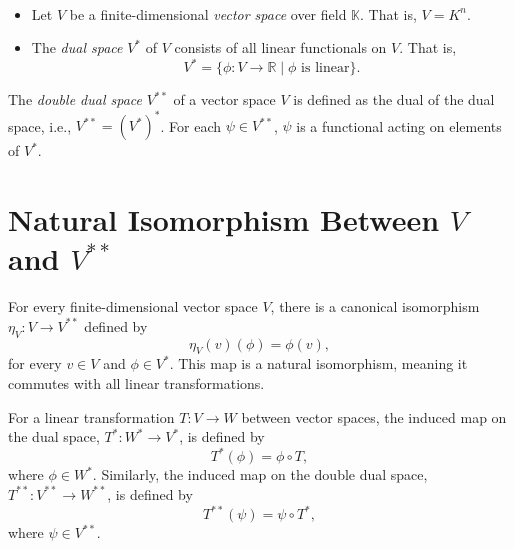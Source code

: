 \begin{example}
\begin{figure}[h!]
\end{figure}
\end{example}
\newpage

\begin{definition}
\ \begin{itemize}
	\item Let $V$ be a finite-dimensional \emph{vector space} over field $\mathbb{K}$. That is, $V=K^n$.
	\item The \emph{dual space} $V^*$ of $V$ consists of all linear functionals on $V$. That is, $$V^* = \{\phi: V \rightarrow \mathbb{R} \mid \phi \text{ is linear}\}.$$
\end{itemize}
\end{definition}

\begin{definition}
	The \emph{double dual space} $V^{**}$ of a vector space $V$ is defined as the dual of the dual space, i.e., $V^{**} = (V^*)^*$. For each $\psi \in V^{**}$, $\psi$ is a functional acting on elements of $V^*$.
\end{definition}

\section*{Natural Isomorphism Between $V$ and $V^{**}$}
\begin{theorem}
	For every finite-dimensional vector space $V$, there is a canonical isomorphism $\eta_V: V \rightarrow V^{**}$ defined by
	\[
	\eta_V(v)(\phi) = \phi(v),
	\]
	for every
$v \in V$ and $\phi \in V^*$. This map is a natural isomorphism, meaning it commutes with all linear transformations.
\end{theorem}
\begin{definition}
	For a linear transformation $T: V \rightarrow W$ between vector spaces, the induced map on the dual space, $T^*: W^* \rightarrow V^*$, is defined by \[
	T^*(\phi)=\phi\circ T, 
	\] where $\phi \in W^*$. Similarly, the induced map on the double dual space, $T^{**}: V^{**} \rightarrow W^{**}$, is defined by \[
	T^{**}(\psi)=\psi\circ T^*,
	\] where $\psi \in V^{**}$.
\end{definition}
